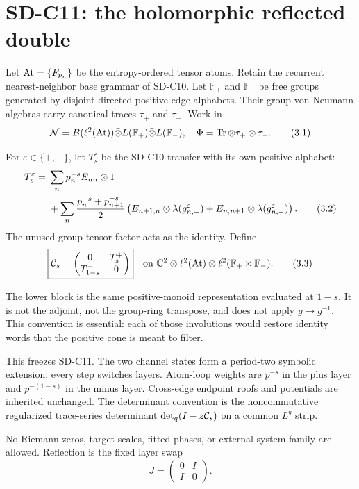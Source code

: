\section{SD-C11: the holomorphic reflected double}
\label{sec:source}

Let $\operatorname{At}=\{F_{p_n}\}$ be the entropy-ordered tensor atoms.  Retain the
recurrent nearest-neighbor base grammar of SD-C10.  Let $\mathbb F_+$ and
$\mathbb F_-$ be free groups generated by disjoint directed-positive edge
alphabets.  Their group von Neumann algebras carry canonical traces
$\tau_+$ and $\tau_-$.  Work in
\[
 \mathcal N=B(\ell^2(\operatorname{At}))\bar\otimes
 L(\mathbb F_+)\bar\otimes L(\mathbb F_-),
 \quad \Phi=\operatorname{Tr}\otimes\tau_+\otimes\tau_-.   \tag{3.1}
\]

For $\varepsilon\in\{+,-\}$, let $T_s^\varepsilon$ be the SD-C10 transfer
with its own positive alphabet:
\begin{align}
 T_s^\varepsilon={}&\sum_np_n^{-s}E_{nn}\otimes1\notag\\
 &+\sum_n\frac{p_n^{-s}+p_{n+1}^{-s}}2
 \left(E_{n+1,n}\otimes\lambda(g_{n,+}^\varepsilon)
 +E_{n,n+1}\otimes\lambda(g_{n,-}^\varepsilon)\right). \tag{3.2}
\end{align}
The unused group tensor factor acts as the identity.  Define
\[
 \boxed{
 \mathcal C_s=\begin{pmatrix}0&T_s^+\\T_{1-s}^-&0\end{pmatrix}}
 \quad\text{on }\mathbb C^2\otimes\ell^2(\operatorname{At})\otimes
 \ell^2(\mathbb F_+\times\mathbb F_-).       \tag{3.3}
\]

The lower block is the same positive-monoid representation evaluated at
$1-s$.  It is not the adjoint, not the group-ring transpose, and does not
apply $g\mapsto g^{-1}$.  This convention is essential: each of those
involutions would restore identity words that the positive cone is meant to
filter.

This freezes SD-C11.  The two channel states form a period-two symbolic
extension; every step switches layers.  Atom-loop weights are $p^{-s}$ in
the plus layer and $p^{-(1-s)}$ in the minus layer.  Cross-edge endpoint roofs
and potentials are inherited unchanged.  The determinant convention is the
noncommutative regularized trace-series determinant $\det_q(I-z\mathcal C_s)$ on a
common $L^q$ strip.

No Riemann zeros, target scales, fitted phases, or external system family are
allowed.  Reflection is the fixed layer swap
\[
 J=\begin{pmatrix}0&I\\I&0\end{pmatrix}.     \tag{3.4}
\]

